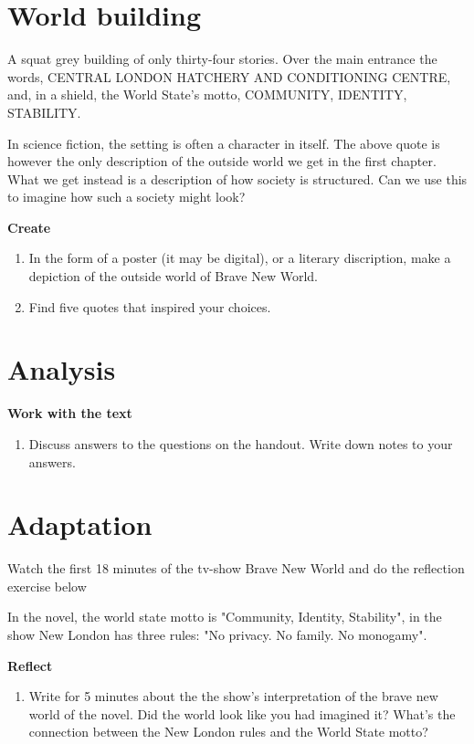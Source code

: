 \documentclass[11pt,a4paper,oneside]{book}
\newcommand{\tasktitle}[1]{{\color{blue}\bfseries #1}\par\smallskip}
\begin{document}
\section*{World building}
\begin{quotebox}
A squat grey building of only thirty-four stories. Over the main entrance the words, CENTRAL LONDON HATCHERY AND CONDITIONING CENTRE, and, in a shield, the World State’s motto, COMMUNITY, IDENTITY, STABILITY.

\end{quotebox}
In science fiction, the setting is often a character in itself. The above quote is however the only description of the outside world we get in the first chapter. What we get instead is a description of how society is structured. Can we use this to imagine how such a society might look?

\begin{taskbox}
\tasktitle{Create}
\begin{enumerate}
\item In the form of a poster (it may be digital), or a literary discription, make a depiction of the outside world of Brave New World.
\item Find five quotes that inspired your choices.
\end{enumerate}
\end{taskbox}

\section*{Analysis}
\begin{taskbox}
\tasktitle{Work with the text}
\begin{enumerate}
\item Discuss answers to the questions on the handout. Write down notes to your answers.
\end{enumerate}
\end{taskbox}

\section*{Adaptation}
Watch the first 18 minutes of the tv-show Brave New World and do the reflection exercise below

In the novel, the world state motto is "Community, Identity, Stability", in the show New London has three rules: "No privacy. No family. No monogamy".

\begin{taskbox}
\tasktitle{Reflect}
\begin{enumerate}
\item Write for 5 minutes about the the show's interpretation of the brave new world of the novel. Did the world look like you had imagined it? What's the connection between the New London rules and the World State motto?
\end{enumerate}
\end{taskbox}
\end{document}
